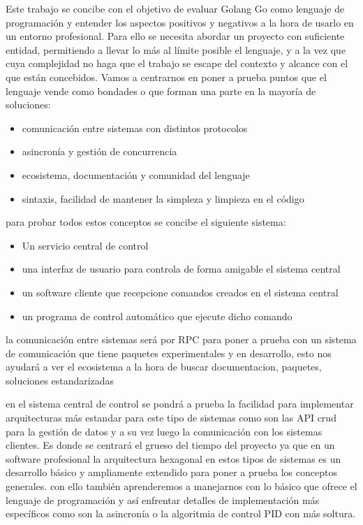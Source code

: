 Este trabajo se concibe con el objetivo de evaluar Golang Go como lenguaje de programación y entender los aspectos positivos y negativos a la hora de usarlo en un entorno profesional. Para ello se necesita abordar un proyecto con suficiente entidad, permitiendo a llevar lo más al límite posible el lenguaje, y a la vez que cuya complejidad no haga que el trabajo se escape del contexto y alcance con el que están concebidos. Vamos a centrarnos en poner a prueba puntos que el lenguaje vende como bondades o que forman una parte en la mayoría de soluciones:

\begin{itemize}
	\item comunicación entre sistemas con distintos protocolos
	\item asincronía y gestión de concurrencia
	\item ecosistema, documentación y comunidad del lenguaje
	\item sintaxis, facilidad de mantener la simpleza y limpieza en el código
\end{itemize} 

para probar todos estos conceptos se concibe el siguiente sistema:

\begin{itemize}
	\item Un servicio central de control
	\item una interfaz de usuario para controla de forma amigable el sistema central
	\item un software cliente que recepcione comandos creados en el sistema central
	\item un programa de control automático que ejecute dicho comando
\end{itemize} 

la comunicación entre sistemas será por RPC para poner a prueba con un sistema de comunicación que tiene paquetes experimentales y en desarrollo, esto nos ayudará a ver el ecosistema a la hora de buscar documentacion, paquetes, soluciones estandarizadas


en el sistema central de control se pondrá a prueba la facilidad para implementar arquitecturas más estandar para este tipo de sistemas como son las API crud para la gestión de datos y a su vez luego la comunicación con los sistemas clientes. Es donde se centrará el grueso del tiempo del proyecto ya que en un software profesional la arquitectura hexagonal en estos tipos de sistemas es un desarrollo básico y ampliamente extendido para poner a prueba los conceptos generales. con ello también aprenderemos a manejarnos con lo básico que ofrece el lenguaje de programación y así enfrentar detalles de implementación más específicos como son la asincronía o la algoritmia de control PID con más soltura.


